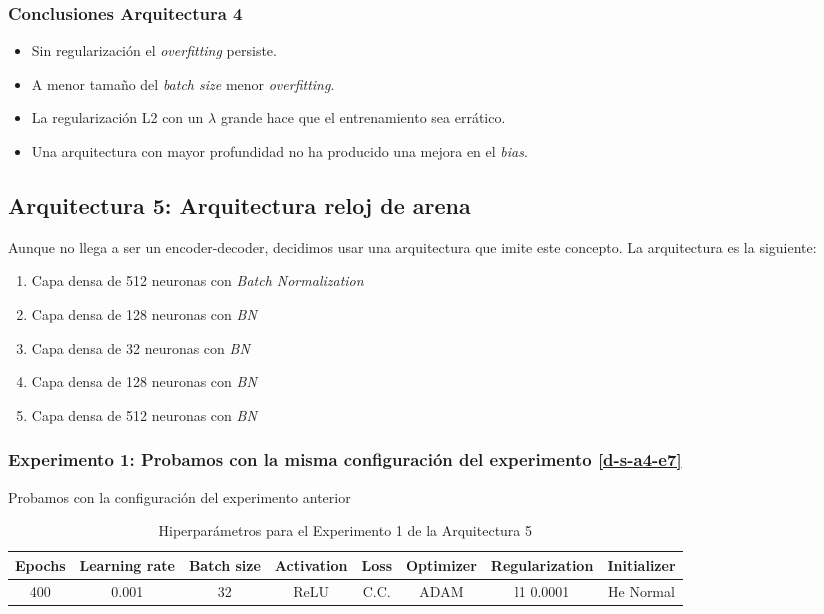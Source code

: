\documentclass{article}
\begin{document}
        \subsubsection{Conclusiones Arquitectura 4}
        \label{d-cl-a4}
            \begin{itemize}
                \item Sin regularizaci\'on el \textit{overfitting} persiste.
                \item A menor tama\~no del \textit{batch size} menor \textit{overfitting}.
                \item La regularizaci\'on L2 con un $\lambda$ grande hace que el entrenamiento sea err\'atico.
                \item Una arquitectura con mayor profundidad no ha producido una mejora en el \textit{bias}.
            \end{itemize}
            

    \subsection{Arquitectura 5: Arquitectura reloj de arena}
	\label{d-s-a5}
		Aunque no llega a ser un encoder-decoder, decidimos usar una arquitectura que imite este concepto. La arquitectura es la siguiente:
		\begin{enumerate}
			\item Capa densa de 512 neuronas con \textit{Batch Normalization}
			\item Capa densa de 128 neuronas con \textit{BN}
			\item Capa densa de 32 neuronas con \textit{BN}
			\item Capa densa de 128 neuronas con \textit{BN}
			\item Capa densa de 512 neuronas con \textit{BN}
		\end{enumerate}
		
		\subsubsection{Experimento 1: Probamos con la misma configuraci\'on del experimento \ref{d-s-a4-e7}}
		\label{d-s-a5-e1}
			Probamos con la configuraci\'on del experimento anterior
		
			\begin{table}[!h]
				\begin{center}
					\begin{tabular}{| c | c | c | c | c | c | c | c |}
						\textbf{Epochs} & \textbf{Learning rate} & \textbf{Batch size} & \textbf{Activation} & \textbf{Loss} & \textbf{Optimizer} & \textbf{Regularization} & \textbf{Initializer}\\ \hline
						 400 & 0.001 & 32 & ReLU & C.C. & ADAM & l1 0.0001 & He Normal
					\end{tabular}
					\caption{Hiperpar\'ametros para el Experimento 1 de la Arquitectura 5}
					\label{tab:hip-d-a5-e1}
				\end{center}
			\end{table}
			
\end{document}
